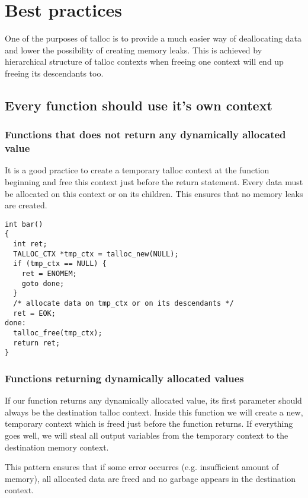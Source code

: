 \section{Best practices}
\label{talloc:sec:best-practices}

One of the purposes of talloc is to provide a much easier way of deallocating
data and lower the possibility of creating memory leaks. This is achieved by
hierarchical structure of talloc contexts when freeing one context will end up
freeing its descendants too.

\subsection{Every function should use it's own context}
\label{talloc:subsec:function-use-own-context}

\subsubsection{Functions that does not return any dynamically allocated value}

It is a good practice to create a temporary talloc context at the function
beginning and free this context just before the return statement. Every data
must be allocated on this context or on its children. This ensures that no
memory leaks are created.

\begin{lstlisting}[caption={Temporary context \#1},label=lst:tmp-ctx-1]
int bar()
{
  int ret;
  TALLOC_CTX *tmp_ctx = talloc_new(NULL);
  if (tmp_ctx == NULL) {
    ret = ENOMEM;
    goto done;
  }
  /* allocate data on tmp_ctx or on its descendants */
  ret = EOK;
done:
  talloc_free(tmp_ctx);
  return ret;
}
\end{lstlisting}

\subsubsection{Functions returning dynamically allocated values}

If our function returns any dynamically allocated value, its first parameter
should always be the destination talloc context. Inside this function we will
create a new, temporary context which is freed just before the function returns.
If everything goes well, we will steal all output variables from the temporary
context to the destination memory context.

This pattern ensures that if some error occurres (e.g. insufficient amount of
memory), all allocated data are freed and no garbage appears in the destination
context.

